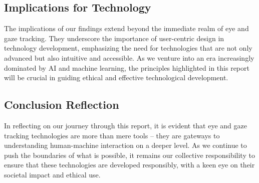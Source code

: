 \documentclass[letterpaper, 10 pt, conference]{ieeeconf}  %
\begin{document}
\subsection{Implications for Technology}
The implications of our findings extend beyond the immediate realm of eye and gaze tracking. They underscore the importance of user-centric design in technology development, emphasizing the need for technologies that are not only advanced but also intuitive and accessible. As we venture into an era increasingly dominated by AI and machine learning, the principles highlighted in this report will be crucial in guiding ethical and effective technological development.

\subsection{Conclusion Reflection}
In reflecting on our journey through this report, it is evident that eye and gaze tracking technologies are more than mere tools – they are gateways to understanding human-machine interaction on a deeper level. As we continue to push the boundaries of what is possible, it remains our collective responsibility to ensure that these technologies are developed responsibly, with a keen eye on their societal impact and ethical use.





\addtolength{\textheight}{-12cm}   %










\end{document}
